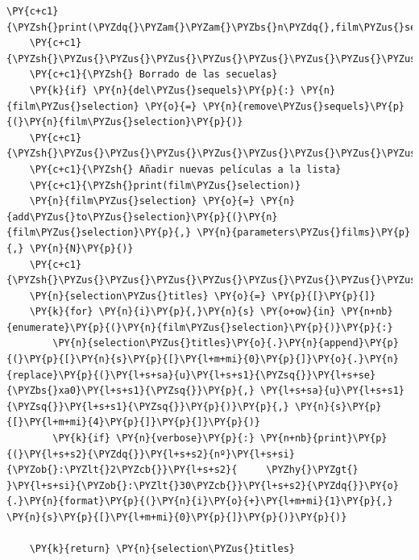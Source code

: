 \begin{tcolorbox}[breakable, size=fbox, boxrule=1pt, pad at break*=1mm,colback=cellbackground, colframe=cellborder]
\begin{Verbatim}[commandchars=\\\{\}]
    \PY{c+c1}{\PYZsh{}print(\PYZdq{}\PYZam{}\PYZam{}\PYZbs{}n\PYZdq{},film\PYZus{}selection)}
    \PY{c+c1}{\PYZsh{}\PYZus{}\PYZus{}\PYZus{}\PYZus{}\PYZus{}\PYZus{}\PYZus{}\PYZus{}\PYZus{}\PYZus{}\PYZus{}\PYZus{}\PYZus{}\PYZus{}\PYZus{}\PYZus{}\PYZus{}\PYZus{}\PYZus{}\PYZus{}\PYZus{}\PYZus{}\PYZus{}\PYZus{}\PYZus{}\PYZus{}\PYZus{}\PYZus{}\PYZus{}\PYZus{}\PYZus{}\PYZus{}\PYZus{}\PYZus{}}
    \PY{c+c1}{\PYZsh{} Borrado de las secuelas}
    \PY{k}{if} \PY{n}{del\PYZus{}sequels}\PY{p}{:} \PY{n}{film\PYZus{}selection} \PY{o}{=} \PY{n}{remove\PYZus{}sequels}\PY{p}{(}\PY{n}{film\PYZus{}selection}\PY{p}{)}
    \PY{c+c1}{\PYZsh{}\PYZus{}\PYZus{}\PYZus{}\PYZus{}\PYZus{}\PYZus{}\PYZus{}\PYZus{}\PYZus{}\PYZus{}\PYZus{}\PYZus{}\PYZus{}\PYZus{}\PYZus{}\PYZus{}\PYZus{}\PYZus{}\PYZus{}\PYZus{}\PYZus{}\PYZus{}\PYZus{}\PYZus{}\PYZus{}\PYZus{}\PYZus{}\PYZus{}\PYZus{}\PYZus{}\PYZus{}\PYZus{}\PYZus{}\PYZus{}\PYZus{}\PYZus{}\PYZus{}\PYZus{}\PYZus{}\PYZus{}\PYZus{}\PYZus{}\PYZus{}\PYZus{}\PYZus{}\PYZus{}}
    \PY{c+c1}{\PYZsh{} Añadir nuevas películas a la lista}
    \PY{c+c1}{\PYZsh{}print(film\PYZus{}selection)}
    \PY{n}{film\PYZus{}selection} \PY{o}{=} \PY{n}{add\PYZus{}to\PYZus{}selection}\PY{p}{(}\PY{n}{film\PYZus{}selection}\PY{p}{,} \PY{n}{parameters\PYZus{}films}\PY{p}{,} \PY{n}{N}\PY{p}{)}
    \PY{c+c1}{\PYZsh{}\PYZus{}\PYZus{}\PYZus{}\PYZus{}\PYZus{}\PYZus{}\PYZus{}\PYZus{}\PYZus{}\PYZus{}\PYZus{}\PYZus{}\PYZus{}\PYZus{}\PYZus{}\PYZus{}\PYZus{}\PYZus{}\PYZus{}\PYZus{}\PYZus{}\PYZus{}\PYZus{}\PYZus{}\PYZus{}\PYZus{}\PYZus{}\PYZus{}\PYZus{}\PYZus{}\PYZus{}\PYZus{}\PYZus{}\PYZus{}\PYZus{}\PYZus{}\PYZus{}\PYZus{}\PYZus{}\PYZus{}\PYZus{}\PYZus{}\PYZus{}\PYZus{}\PYZus{}}
    \PY{n}{selection\PYZus{}titles} \PY{o}{=} \PY{p}{[}\PY{p}{]}
    \PY{k}{for} \PY{n}{i}\PY{p}{,}\PY{n}{s} \PY{o+ow}{in} \PY{n+nb}{enumerate}\PY{p}{(}\PY{n}{film\PYZus{}selection}\PY{p}{)}\PY{p}{:}
        \PY{n}{selection\PYZus{}titles}\PY{o}{.}\PY{n}{append}\PY{p}{(}\PY{p}{[}\PY{n}{s}\PY{p}{[}\PY{l+m+mi}{0}\PY{p}{]}\PY{o}{.}\PY{n}{replace}\PY{p}{(}\PY{l+s+sa}{u}\PY{l+s+s1}{\PYZsq{}}\PY{l+s+se}{\PYZbs{}xa0}\PY{l+s+s1}{\PYZsq{}}\PY{p}{,} \PY{l+s+sa}{u}\PY{l+s+s1}{\PYZsq{}}\PY{l+s+s1}{\PYZsq{}}\PY{p}{)}\PY{p}{,} \PY{n}{s}\PY{p}{[}\PY{l+m+mi}{4}\PY{p}{]}\PY{p}{]}\PY{p}{)}
        \PY{k}{if} \PY{n}{verbose}\PY{p}{:} \PY{n+nb}{print}\PY{p}{(}\PY{l+s+s2}{\PYZdq{}}\PY{l+s+s2}{nº}\PY{l+s+si}{\PYZob{}:\PYZlt{}2\PYZcb{}}\PY{l+s+s2}{     \PYZhy{}\PYZgt{} }\PY{l+s+si}{\PYZob{}:\PYZlt{}30\PYZcb{}}\PY{l+s+s2}{\PYZdq{}}\PY{o}{.}\PY{n}{format}\PY{p}{(}\PY{n}{i}\PY{o}{+}\PY{l+m+mi}{1}\PY{p}{,} \PY{n}{s}\PY{p}{[}\PY{l+m+mi}{0}\PY{p}{]}\PY{p}{)}\PY{p}{)}

    \PY{k}{return} \PY{n}{selection\PYZus{}titles}
\end{Verbatim}
\end{tcolorbox}

